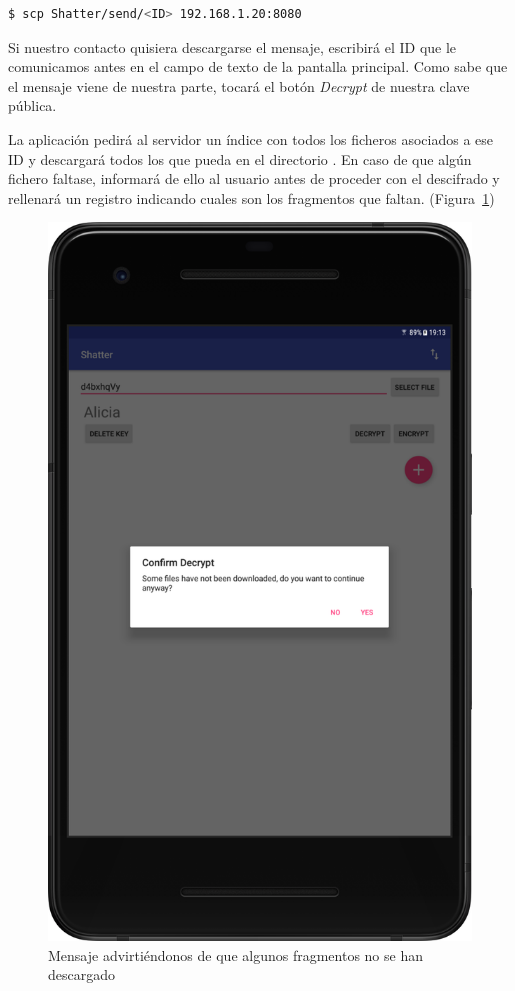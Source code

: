 \begin{lstlisting}[language=bash]
  $ scp Shatter/send/<ID> 192.168.1.20:8080
\end{lstlisting}

Si nuestro contacto quisiera descargarse el mensaje, escribirá el ID que le
comunicamos antes en el campo de texto de la pantalla principal. Como sabe que
el mensaje viene de nuestra parte, tocará el botón \emph{Decrypt} de nuestra
clave pública.

La aplicación pedirá al servidor un índice con todos los ficheros asociados a
ese ID y descargará todos los que pueda en el directorio .
En caso de que algún fichero faltase, informará de ello al usuario antes de
proceder con el descifrado y rellenará un registro indicando cuales son los
fragmentos que faltan. (Figura~\ref{fig:miss})

\begin{figure}[ht]
  \centering
  \includegraphics[scale=0.4]{Figures/miss}
  \decoRule
  \caption[Shatter (Faltan fragmentos)]{Mensaje advirtiéndonos de que algunos
  fragmentos no se han descargado}
  \label{fig:miss}
\end{figure}

